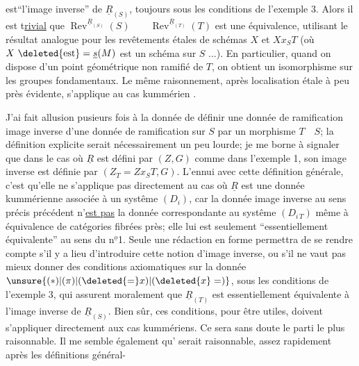 
est``l'image inverse'' de $\underline{R}_{(S)}$, toujours sous les conditions de l'exemple 3. Alors il est t\uline{rivial} que $\operatorname{Rev}^{\underline{R}_{(S)}}(S)\qquad\operatorname{Rev}^{\underline{R}_{(T)}}(T)$ est une équivalence, utilisant le résultat analogue pour les revêtements étales de schémas $X$ et $Xx_{S}T$ (où $X\ \deleted{\mathrm{est}}=\underline{s}(M)$ est un schéma  sur $S$ ...). En particulier, quand on dispose d'un point géométrique non ramifié de $T$, on obtient un isomorphisme sur les groupes fondamentaux. Le même raisonnement, après localisation étale à peu près évidente, s'applique au cas kummérien .

J'ai fait allusion pusieurs fois à la donnée de définir une donnée de ramification image inverse d'une donnée de ramification sur $S$ par un morphisme $T\quad S$; la définition explicite serait nécessairement un peu lourde; je me borne à signaler que dans le cas où $\underline{R}$ est défini par $(Z,G)$ comme dans l'exemple 1, son image inverse est définie par $(Z_T=Zx_ST,G)$. L'ennui avec cette définition générale, c'est qu'elle ne s'applique pas directement au cas où $\underline{R}$ est une donnée kummérienne associée à un systême $(D_i)$, car la donnée image inverse au sens précis précédent n'\uline{est pas} la donnée correspondante au systême $(D_{i\,T})$ même à équivalence de catégories fibrées près; elle lui est seulement ``essentiellement équivalente'' au sens du n$^{\underline{o}}$1. Seule une rédaction en forme permettra de se rendre compte s'il y a lieu d'introduire cette notion d'image inverse, ou s'il ne vaut pas mieux donner des conditions axiomatiques sur la donnée $\unsure{(*)|(\pi)|(\deleted{=}x)|(\deleted{x}=)}$, sous les conditions de l'exemple 3, qui assurent moralement que $\underline{R}_{(T)}$ est essentiellement équivalente à l'image inverse de $\underline{R}_{(S)}$. Bien sûr, ces conditions, pour  être utiles, doivent s'appliquer directement aux cas kummériens. Ce sera sans doute le parti le plus raisonnable. Il me semble également qu' serait raisonnable, assez rapidement après les définitions général-
